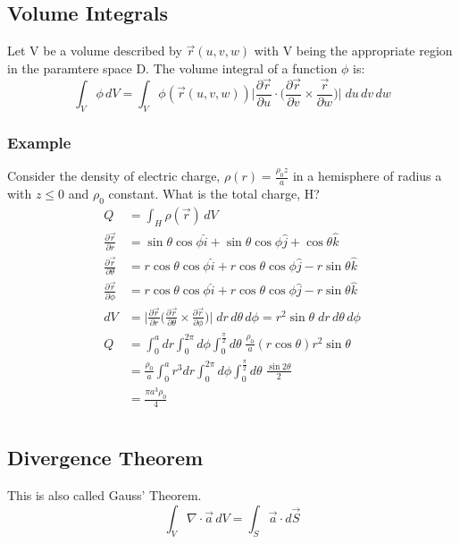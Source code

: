 \documentclass[a4paper, 11pt, normalem]{report}
\newcommand\p{\partial}
\begin{document}
\section{Volume Integrals}
Let V be a volume described by $\vec{r}(u, v, w)$ with V being the appropriate region in the paramtere space D.
The volume integral of a function $\phi$ is:
\begin{equation*}
    \int_V \phi\,dV = \int_V \phi(\vec{r}(u, v, w)) \Bigg| \frac{\p \vec{r}}{\p u} \cdot \Big(\frac{\p \vec{r}}{\p v} \times \frac{\vec{r}}{\p w}\Big)\Bigg|\;du\,dv\,dw
\end{equation*}

\subsection{Example}
Consider the density of electric charge, $\rho(r) = \frac{\rho_0 z}{a}$ in a hemisphere of radius a with $z \leq 0$ and $\rho_0$ constant.
What is the total charge, H?
\begin{align*}
    Q &= \int_H \rho(\vec{r})\,dV \\
    \frac{\p \vec{r}}{\p r} &= \sin\theta\cos\phi \hat{i} + \sin\theta\cos\phi \hat{j} + \cos\theta \hat{k} \\
    \frac{\p \vec{r}}{\p \theta} &= r\cos\theta\cos\phi \hat{i} + r\cos\theta\cos\phi \hat{j} - r\sin\theta \hat{k} \\
    \frac{\p \vec{r}}{\p \phi} &= r\cos\theta\cos\phi \hat{i} + r\cos\theta\cos\phi \hat{j} - r\sin\theta\hat{k} \\
    dV &= \Bigg| \frac{\p \vec{r}}{\p r} \Big(\frac{\p \vec{r}}{\p \theta} \times \frac{\p \vec{r}}{\p \phi}\Big)\Bigg|\;dr\,d\theta\,d\phi = r^2 \sin\theta \;dr\,d\theta\,d\phi \\
    Q &= \int_{0}^a dr \int_0^{2\pi} d\phi \int_{0}^{\frac{\pi}{2}} d\theta\; \frac{\rho_0}{a} (r\cos\theta)r^2\sin\theta \\
    &= \frac{\rho_0}{a} \int_0^a r^3 dr \int_0^{2\pi} d\phi \int_{0}^{\frac{\pi}{2}} d\theta\; \frac{\sin 2\theta}{2} \\
    &= \frac{\pi a^3 \rho_0}{4}
\end{align*}


\chapter{}
\section{Divergence Theorem}
This is also called Gauss' Theorem.
\begin{equation*}
    \int_V \nabla \cdot \vec{a}\,dV = \int_S \vec{a}\cdot d\vec{S}
\end{equation*}
\end{document}

